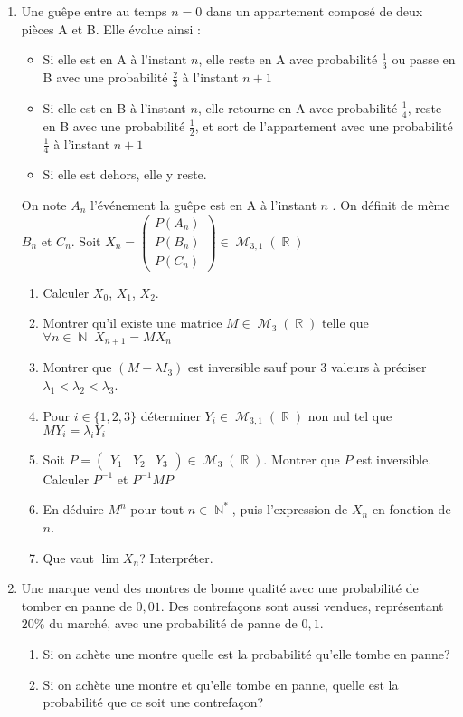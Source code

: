 \documentclass[12pt,a4paper]{article}
\DeclareMathOperator{\R}{\mathbb{R}}
\DeclareMathOperator{\N}{\mathbb{N}}
\DeclareMathOperator{\M}{\mathcal{M}}
\begin{document}
\begin{enumerate}
\item Une gu\^epe entre au temps $n=0$ dans un appartement compos\'e de deux 
pi\`eces A et B. Elle \'evolue ainsi :
\begin{itemize}
\item Si elle est en A \`a l'instant $n$, elle reste en A avec 
probabilit\'e $\frac{1}{3}$ ou passe en B avec une probabilit\'e $\frac{2}{3}$ \`a l'instant $n+1$
\item Si elle est en B \`a l'instant $n$, elle retourne en A avec 
probabilit\'e $\frac{1}{4}$, reste en B avec 
une probabilit\'e $\frac{1}{2}$, et sort de l'appartement
avec une probabilit\'e $\frac{1}{4}$ \`a l'instant $n+1$
\item Si elle est dehors, elle y reste.
\end{itemize}
On note $A_n$ l'\'ev\'enement \og la gu\^epe est en A 
\`a l'instant $n$ \fg. On d\'efinit de m\^eme $B_n$ et $C_n$.
Soit $X_n=\begin{pmatrix}
P(A_n)\\P(B_n)\\P(C_n)
\end{pmatrix}\in\M_{3,1}(\R)$
\begin{enumerate}
\item Calculer $X_0$, $X_1$, $X_2$.
\item Montrer qu'il existe une matrice 
$M\in\M_3(\R)$ telle que $\forall n\in\N\; X_{n+1}=MX_n$
\item Montrer que $(M-\lambda I_3)$ est inversible sauf pour  $3$ valeurs à préciser $\lambda_1<\lambda_2<\lambda_3$.
\item Pour $i\in\{1,2,3\}$ d\'eterminer $Y_i\in\M_{3,1}(\R)$ non nul tel que $MY_i=\lambda_i Y_i$
\item Soit $P=\begin{pmatrix}
Y_1 & Y_2 & Y_3
\end{pmatrix}\in\M_3(\R)$. Montrer que $P$ est inversible. Calculer $P^{-1}$ 
et $P^{-1}MP$
\item En d\'eduire $M^n$ pour tout $n\in\N^*$, puis l'expression de $X_n$ 
en fonction de $n$.
\item Que vaut $\lim X_n$? Interpr\'eter. 
\end{enumerate}

\item
Une marque vend des montres de bonne qualité avec une probabilité de tomber en panne de $0,01$. Des contrefaçons sont aussi vendues, représentant $20\%$ du marché, avec une probabilité de panne de $0,1$.
\begin{enumerate}
	\item
	Si on achète une montre quelle est la probabilité qu'elle tombe en panne?
	\item
	Si on achète une montre et qu'elle tombe en panne, quelle est la probabilité que ce soit une contrefaçon?
\end{enumerate}


\end{enumerate}
\end{document}

